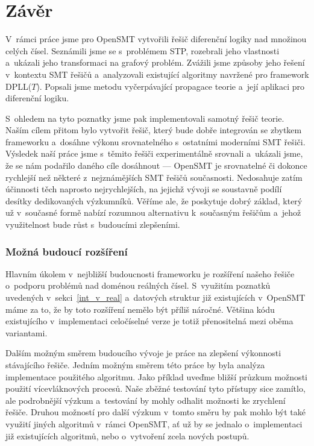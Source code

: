 \chapter*{Závěr}

V~rámci práce jsme pro OpenSMT vytvořili řešič diferenční logiky nad množinou celých čísel. Seznámili jsme se s~problémem STP, rozebrali jeho vlastnosti a~ukázali jeho transformaci na grafový problém. Zvážili jsme způsoby jeho řešení v~kontextu SMT řešičů a~analyzovali existující algoritmy navržené pro framework DPLL($T$). Popsali jsme metodu vyčerpávající propagace teorie a~její aplikaci pro diferenční logiku.

S~ohledem na tyto poznatky jsme pak implementovali samotný řešič teorie. Naším cílem přitom bylo vytvořit řešič, který bude dobře integrován se zbytkem frameworku a~dosáhne výkonu srovnatelného s~ostatními moderními SMT řešiči. Výsledek naší práce jsme s~těmito řešiči experimentálně srovnali a~ukázali jsme, že se nám podařilo daného cíle dosáhnout --- OpenSMT je srovnatelné či dokonce rychlejší než některé z~nejznámějších SMT řešičů současnosti. Nedosahuje zatím účinnosti těch naprosto nejrychlejších, na jejichž vývoji se soustavně podílí desítky dedikovaných výzkumníků. Věříme ale, že poskytuje dobrý základ, který už v~současné formě nabízí rozumnou alternativu k~současným řešičům a~jehož využitelnost bude růst s~budoucími zlepšeními. 

\subsection*{Možná budoucí rozšíření}

Hlavním úkolem v~nejbližší budoucnosti frameworku je rozšíření našeho řešiče o~podporu problémů nad doménou reálných čísel. S~využitím poznatků uvedených v~sekci~\ref{int_v_real} a~datových struktur již existujících v~OpenSMT máme za to, že by toto rozšíření nemělo být příliš náročné. Většina kódu existujícího v~implementaci celočíselné verze je totiž přenositelná mezi oběma variantami.

Dalším možným směrem budoucího vývoje je práce na zlepšení výkonnosti stávajícího řešiče. Jedním možným směrem této práce by byla analýza implementace použitého algoritmu. Jako příklad uveďme bližší průzkum možnosti použití vícevláknových procesů. Naše zběžné testování tyto přístupy sice zamítlo, ale podrobnější výzkum a~testování by mohly odhalit možnosti ke zrychlení řešiče. Druhou možností pro další výzkum v~tomto směru by pak mohlo být také využití jiných algoritmů v~rámci OpenSMT, ať už by se jednalo o~implementaci již existujících algoritmů, nebo o~vytvoření zcela nových postupů.
